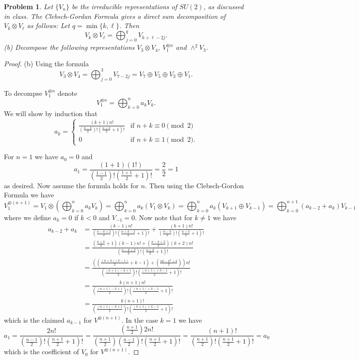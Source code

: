 \documentclass{article}
\newtheorem{problem}{Problem}
\begin{document}
\begin{problem}
Let $\{V_n\}$ be the irreducible representations of $SU(2)$, as discussed in class. The \emph{Clebsch-Gordan Formula} gives a direct sum decomposition of $V_k \otimes V_{\ell}$ as follows: Let $q = \min\{k,\ell\}$. Then
\[
V_k \otimes V_{\ell} = \bigoplus_{j=0}^q V_{k+\ell-2j}.
\]
(b) Decompose the following representations $V_3 \otimes V_4$, $V_1^{\otimes n}$ and $\wedge^2 V_3$.
\end{problem}
\begin{proof}
(b) Using the formula
\[
V_3 \otimes V_4 = \bigoplus_{j=0}^3 V_{7 - 2j} = V_7 \oplus V_5 \oplus V_3 \oplus V_1.
\]

To decompse $V_1^{\otimes n}$ denote
\[
V_1^{\otimes n} = \bigoplus_{k=0}^{n} a_k V_k.
\]
We will show by induction that
\[
a_k =
\begin{cases}
\frac{(k+1)n!}{\left ( \frac{n-k}{2} \right )! \left ( \frac{n+k}{2} + 1 \right )!} & \text{if $n + k \equiv 0 \pmod{2}$}\\
0 & \text{if $n+k \equiv 1 \pmod{2}$}.
\end{cases}
\]

For $n = 1$ we have $a_0 = 0$ and
\[
a_1 = \frac{(1 + 1)(1!)}{\left ( \frac{1-1}{2} \right )! \left ( \frac{1+1}{2} + 1 \right )!} = \frac{2}{2} = 1
\]
as desired. Now assume the formula holds for $n$. Then using the Clebsch-Gordon Formula we have
\[
V_1^{\otimes (n+1)} = V_1 \otimes \left (\bigoplus_{k=0}^{n} a_k V_k \right ) = \bigoplus_{k=0}^n a_k (V_1 \otimes V_k) = \bigoplus_{k=0}^n a_k (V_{k+1} \oplus V_{k-1}) = \bigoplus_{k=0}^{n+1} (a_{k-2} + a_k) V_{k-1}
\]
where we define $a_k = 0$ if $k < 0$ and $V_{-1} = 0$. Now note that for $k \neq 1$ we have
\begin{align*}
a_{k-2} + a_k
&= \frac{(k-1)n!}{\left ( \frac{n-k+2}{2} \right )! \left ( \frac{n+k-2}{2} + 1 \right )!} + \frac{(k+1)n!}{\left ( \frac{n-k}{2} \right )! \left ( \frac{n+k}{2} + 1 \right )!}\\
&= \frac{\left ( \frac{n+k}{2} + 1 \right )(k-1)n! + \left ( \frac{n-k+2}{2} \right )(k+2)n!}{\left ( \frac{n-k+2}{2} \right )! \left ( \frac{n+k}{2} + 1 \right )!}\\
&= \frac{\left ( \left ( \frac{(n+k)(k-1)}{2} + k - 1 \right ) + \left ( \frac{nk-k^2+k}{2} \right ) \right )n!}{\left ( \frac{(n+1)-k+1}{2} \right )! \left ( \frac{(n+1)+k-1}{2} + 1 \right )!}\\
&= \frac{k(n+1)n!}{\left ( \frac{(n+1)-k+1}{2} \right )! \left ( \frac{(n+1)+k-1}{2} + 1 \right )!}\\
&= \frac{k(n+1)!}{\left ( \frac{(n+1)-k+1}{2} \right )! \left ( \frac{(n+1)+k-1}{2} + 1 \right )!}
\end{align*}
which is the claimed $a_{k-1}$ for $V^{\otimes (n+1)}$. In the case $k = 1$ we have
\[
a_1 = \frac{2n!}{\left (\frac{n-1}{2} \right )! \left ( \frac{n+1}{2} + 1 \right )!} = \frac{ \left ( \frac{n+1}{2} \right ) 2 n!}{\left ( \frac{n+1}{2} \right )\left (\frac{n-1}{2} \right )! \left (\frac{n+1}{2} + 1 \right )!} = \frac{(n+1)!}{\left (\frac{n+1}{2} \right )! \left (\frac{n+1}{2} + 1 \right )!} = a_0
\]
which is the coefficient of $V_0$ for $V^{\otimes (n+1)}$.


\end{proof}
\end{document}
